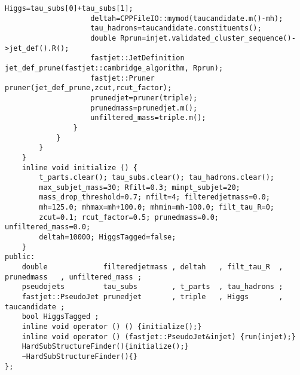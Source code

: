 \documentclass[12pt,a3paper,titlepage]{article}
\begin{document}
\begin{lstlisting}[style=CStyle]
                    Higgs=tau_subs[0]+tau_subs[1];
                    deltah=CPPFileIO::mymod(taucandidate.m()-mh);
                    tau_hadrons=taucandidate.constituents();
                    double Rprun=injet.validated_cluster_sequence()->jet_def().R();
                    fastjet::JetDefinition jet_def_prune(fastjet::cambridge_algorithm, Rprun);
                    fastjet::Pruner pruner(jet_def_prune,zcut,rcut_factor);
                    prunedjet=pruner(triple);
                    prunedmass=prunedjet.m();
                    unfiltered_mass=triple.m();
                }
            }
        }
    }
    inline void initialize () {
        t_parts.clear(); tau_subs.clear(); tau_hadrons.clear();
        max_subjet_mass=30; Rfilt=0.3; minpt_subjet=20;
        mass_drop_threshold=0.7; nfilt=4; filteredjetmass=0.0;
        mh=125.0; mhmax=mh+100.0; mhmin=mh-100.0; filt_tau_R=0;
        zcut=0.1; rcut_factor=0.5; prunedmass=0.0; unfiltered_mass=0.0;
        deltah=10000; HiggsTagged=false;
    }
public:
    double             filteredjetmass , deltah   , filt_tau_R  , prunedmass   , unfiltered_mass ;
    pseudojets         tau_subs        , t_parts  , tau_hadrons ;
    fastjet::PseudoJet prunedjet       , triple   , Higgs       , taucandidate ;
    bool HiggsTagged ;
    inline void operator () () {initialize();}
    inline void operator () (fastjet::PseudoJet&injet) {run(injet);}
    HardSubStructureFinder(){initialize();}
    ~HardSubStructureFinder(){}
};
\end{lstlisting}
\end{document}
